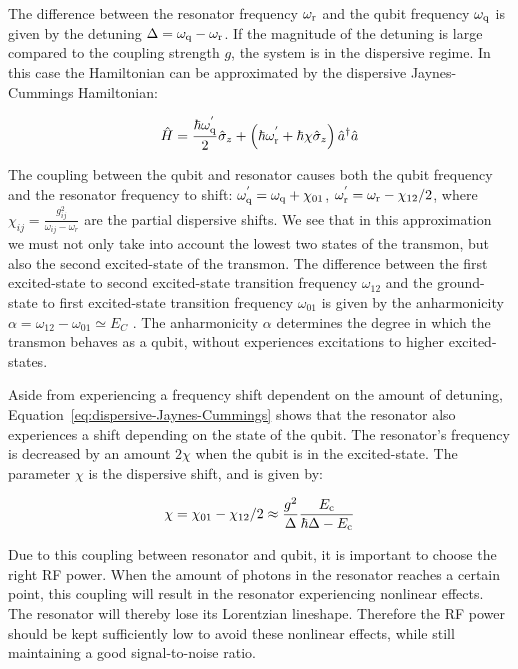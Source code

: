         The difference between the resonator frequency $\omega_\text{r}$ and the qubit frequency $\omega_\text{q}$ is given by the detuning $\Delta = \omega_\text{q} - \omega_\text{r}$. If the magnitude of the detuning is large compared to the coupling strength $g$, the system is in the dispersive regime. In this case the Hamiltonian can be approximated by the dispersive Jaynes-Cummings Hamiltonian:

        \begin{equation}
          \hat{H} = \frac{\hbar \omega_\text{q}^{'}}{2} \hat{\sigma}_z +  \left(\hbar \omega_\text{r}^{'} + \hbar \chi \hat{\sigma}_z\right) \hat{a}^\dagger \hat{a}
          \label{eq:dispersive-Jaynes-Cummings}
        \end{equation}

        The coupling between the qubit and resonator causes both the qubit frequency and the resonator frequency to shift: $\omega_\text{q}^{'} = \omega_\text{q} + \chi_{01}$, $\omega_\text{r}^{'}=\omega_\text{r} - \chi_{12}/2$, where $\chi_{ij} = \frac{g_{ij}^2}{\omega_{ij}-\omega_r}$ are the partial dispersive shifts. We see that in this approximation we must not only take into account the lowest two states of the transmon, but also the second excited-state of the transmon. The difference between the first excited-state to second excited-state transition frequency $\omega_{12}$ and the ground-state to first excited-state transition frequency $\omega_{01}$ is given by the anharmonicity $\alpha=\omega_{12} - \omega_{01} \simeq E_C$ \cite{koch2007Transmon}. The anharmonicity $\alpha$ determines the degree in which the transmon behaves as a qubit, without experiences excitations to higher excited-states.

        Aside from experiencing a frequency shift dependent on the amount of detuning, Equation~\ref{eq:dispersive-Jaynes-Cummings} shows that the resonator also experiences a shift depending on the state of the qubit. The resonator's frequency is decreased by an amount $2 \chi$ when the qubit is in the excited-state. The parameter $\chi$ is the dispersive shift, and is given by:

        \begin{equation}
          \chi = \chi_{01} - \chi_{12}/2 \approx \frac{g^2}{\Delta}\frac{E_\text{c}}{\hbar \Delta - E_\text{c}}
          \label{eq:dispersive-shift}
        \end{equation}

        Due to this coupling between resonator and qubit, it is important to choose the right RF power. When the amount of photons in the resonator reaches a certain point, this coupling will result in the resonator experiencing nonlinear effects. The resonator will thereby lose its Lorentzian lineshape. Therefore the RF power should be kept sufficiently low to avoid these nonlinear effects, while still maintaining a good signal-to-noise ratio.

